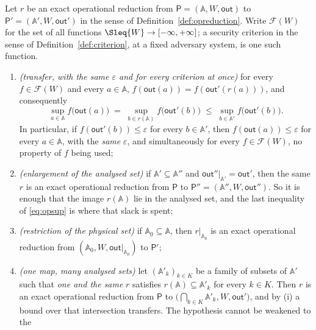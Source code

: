 \begin{lemma}\label{lem:opreduction-transfer}
Let $r$ be an exact operational reduction from
$\mathsf{P}=(\mathbb{A},W,\mathsf{out})$ to
$\mathsf{P}'=(\mathbb{A}',W,\mathsf{out}')$ in the sense of
Definition~\ref{def:opreduction}. Write $\mathcal{F}(W)$ for the set of all
functions $\Sleq{W}\to[-\infty,+\infty]$; a security criterion in the sense of
Definition~\ref{def:criterion}, at a fixed adversary system, is one such
function.
\begin{enumerate}[label=(\roman*),leftmargin=3.0em]
\item \emph{(transfer, with the same $\varepsilon$ and for every criterion at
  once)} for every $f\in\mathcal{F}(W)$ and every $a\in\mathbb{A}$,
  $f(\mathsf{out}(a))=f(\mathsf{out}'(r(a)))$, and consequently
  \begin{equation}\label{eq:opsup}
    \sup_{a\in\mathbb{A}}f\big(\mathsf{out}(a)\big)
    \;=\;\sup_{b\in r(\mathbb{A})}f\big(\mathsf{out}'(b)\big)
    \;\le\;\sup_{b\in\mathbb{A}'}f\big(\mathsf{out}'(b)\big) .
  \end{equation}
  In particular, if $f(\mathsf{out}'(b))\le\varepsilon$ for every
  $b\in\mathbb{A}'$, then $f(\mathsf{out}(a))\le\varepsilon$ for every
  $a\in\mathbb{A}$, with the \emph{same} $\varepsilon$, and simultaneously
  for every $f\in\mathcal{F}(W)$, no property of $f$ being used;
\item \emph{(enlargement of the analysed set)} if
  $\mathbb{A}'\subseteq\mathbb{A}''$ and
  $\mathsf{out}''|_{\mathbb{A}'}=\mathsf{out}'$, then the same $r$ is an
  exact operational reduction from $\mathsf{P}$ to
  $\mathsf{P}''=(\mathbb{A}'',W,\mathsf{out}'')$. So it is enough that the
  image $r(\mathbb{A})$ lie in the analysed set, and the last inequality of
  \eqref{eq:opsup} is where that slack is spent;
\item \emph{(restriction of the physical set)} if
  $\mathbb{A}_0\subseteq\mathbb{A}$, then $r|_{\mathbb{A}_0}$ is an exact
  operational reduction from $(\mathbb{A}_0,W,\mathsf{out}|_{\mathbb{A}_0})$ to
  $\mathsf{P}'$;
\item \emph{(one map, many analysed sets)} let $(\mathbb{A}'_k)_{k\in K}$ be a
  family of subsets of $\mathbb{A}'$ such that \emph{one and the same} $r$
  satisfies $r(\mathbb{A})\subseteq\mathbb{A}'_k$ for every $k\in K$. Then $r$
  is an exact operational reduction from $\mathsf{P}$ to
  $\big(\bigcap_{k\in K}\mathbb{A}'_k,W,\mathsf{out}'\big)$, and by (i) a bound
  over that intersection transfers. The hypothesis cannot be weakened to the

\end{enumerate}
\end{lemma}
